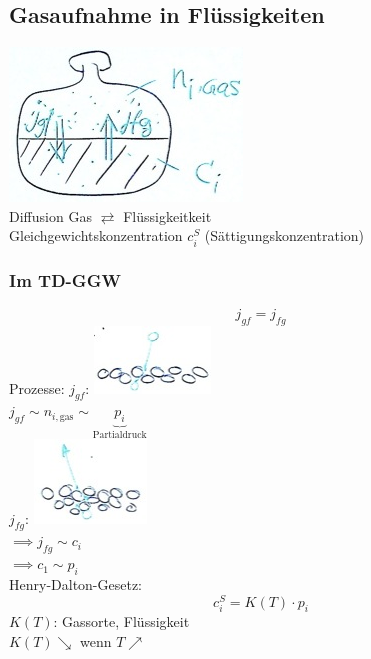 \subsection{Gasaufnahme in Flüssigkeiten}
\includegraphics{Bild125} \\
Diffusion Gas $\rightleftarrows$ Flüssigkeitkeit \\
Gleichgewichtskonzentration $c_i^S$ (Sättigungskonzentration)

\subsubsection{Im TD-GGW}
\[ j_{gf} = j_{fg} \]
Prozesse:
$j_{gf}$: \includegraphics{Bild126} \\
$j_{gf} \sim n_{i,\text{gas}} \sim \underbrace{p_i}_{\text{Partialdruck}}$ \\
$j_{fg}$: \includegraphics{Bild127} \\
$\implies j_{fg} \sim c_i$ \\
$\implies c_1 \sim p_i$ \\
Henry-Dalton-Gesetz:
\[ c_i^S = K(T) \cdot p_i \]
$K(T)$: Gassorte, Flüssigkeit \\
$K(T) \searrow$ wenn $T \nearrow$

